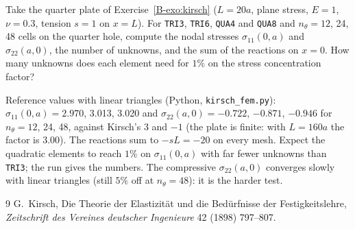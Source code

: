 \label{exo:cc-kirsch}
%
Take the quarter plate of Exercise~\ref{B-exo:kirsch} ($L=20a$, plane
stress, $E=1$, $\nu=0.3$, tension $s=1$ on $x=L$). For \texttt{TRI3},
\texttt{TRI6}, \texttt{QUA4} and \texttt{QUA8} and $n_\theta=12$, 24, 48 cells
on the quarter hole, compute the nodal stresses $\sigma_{11}(0,a)$ and
$\sigma_{22}(a,0)$, the number of unknowns, and the sum of the reactions on
$x=0$. How many unknowns does each element need for $1\%$ on the stress
concentration factor?
\begin{solution}
Reference values with linear triangles (Python,
\texttt{kirsch\_fem.py}): $\sigma_{11}(0,a)=2.970$, 3.013, 3.020 and
$\sigma_{22}(a,0)=-0.722$, $-0.871$, $-0.946$ for $n_\theta=12$, 24, 48,
against Kirsch's 3 and $-1$ (the plate is finite: with $L=160a$ the factor
is $3.00$). The reactions sum to $-sL=-20$ on every mesh. Expect the
quadratic elements to reach $1\%$ on $\sigma_{11}(0,a)$ with far fewer
unknowns than \texttt{TRI3}; the run gives the numbers. The compressive
$\sigma_{22}(a,0)$ converges slowly with linear triangles (still $5\%$ off at
$n_\theta=48$): it is the harder test.

\end{solution}

\begin{chapterbib}{9}
 G.~Kirsch, Die Theorie der Elastizit\"at und die
  Bed\"urfnisse der Festigkeitslehre, \emph{Zeitschrift des Vereines deutscher
  Ingenieure} 42 (1898) 797--807.
\end{chapterbib}
